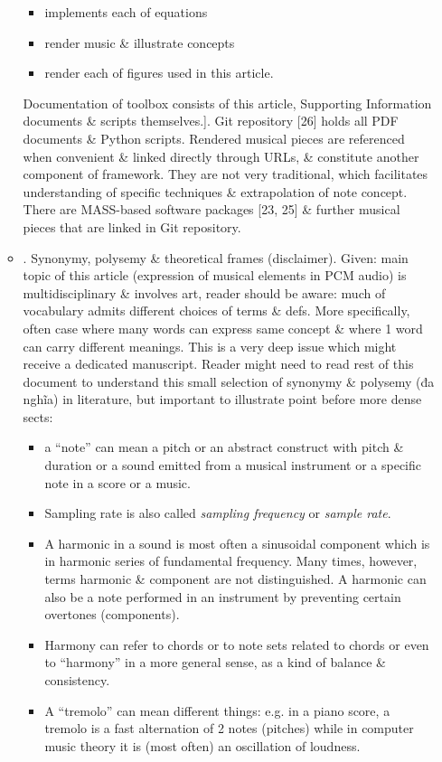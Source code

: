 \documentclass{article}
\begin{document}
\begin{itemize}
\begin{itemize}
		\begin{itemize}
			\item implements each of equations
			\item render music \& illustrate concepts
			\item render each of figures used in this article.
		\end{itemize}
		Documentation of toolbox consists of this article, Supporting Information documents \& scripts themselves.]. Git repository [26] holds all PDF documents \& Python scripts. Rendered musical pieces are referenced when convenient \& linked directly through URLs, \& constitute another component of framework. They are not very traditional, which facilitates understanding of specific techniques \& extrapolation of note concept. There are MASS-based software packages [23, 25] \& further musical pieces that are linked in Git repository.
		\item {. Synonymy, polysemy \& theoretical frames (disclaimer).} Given: main topic of this article (expression of musical elements in PCM audio) is multidisciplinary \& involves art, reader should be aware: much of vocabulary admits different choices of terms \& defs. More specifically, often case where many words can express same concept \& where 1 word can carry different meanings. This is a very deep issue which might receive a dedicated manuscript. Reader might need to read rest of this document to understand this small selection of synonymy \& polysemy (đa nghĩa) in literature, but important to illustrate point before more dense sects:
		\begin{itemize}
			\item a ``note'' can mean a pitch or an abstract construct with pitch \& duration or a sound emitted from a musical instrument or a specific note in a score or a music.
			\item Sampling rate is also called {\it sampling frequency} or {\it sample rate}.
			\item A harmonic in a sound is most often a sinusoidal component which is in harmonic series of fundamental frequency. Many times, however, terms harmonic \& component are not distinguished. A harmonic can also be a note performed in an instrument by preventing certain overtones (components).
			\item Harmony can refer to chords or to note sets related to chords or even to ``harmony'' in a more general sense, as a kind of balance \& consistency.
			\item A ``tremolo'' can mean different things: e.g. in a piano score, a tremolo is a fast alternation of 2 notes (pitches) while in computer music theory it is (most often) an oscillation of loudness.

\end{itemize}
\end{itemize}
\end{itemize}
\end{document}
